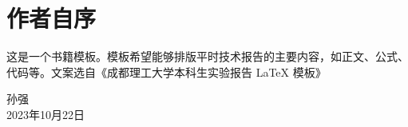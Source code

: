\chapter*{作者自序}

这是一个书籍模板。模板希望能够排版平时技术报告的主要内容，如正文、公式、代码等。文案选自《成都理工大学本科生实验报告 LaTeX 模板》

\begin{flushright}
    孙强\\
    2023年10月22日
\end{flushright}